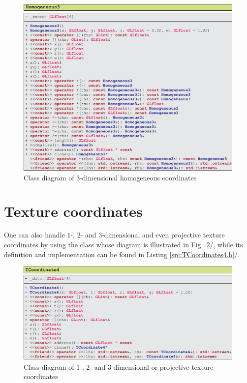 \documentclass[b5paper, twosided]{book}
\newcommand{\CBlue}[1]{{\color[rgb]{0.0, 0.0, 0.9}{#1}}}
\DeclareRobustCommand{\mref}[1]{\ref{#1}{\relsize{-1}/\pageref{#1}}}
\begin{document}
\begin{figure}[!h]
    \centering
    \includegraphics[]{images/UMLHomogeneous3.pdf}
    \caption{Class diagram of $3$-dimensional homogeneous coordinates}
    \label{fig:UMLHomogeneous3}
\end{figure}




\section{Texture coordinates}

One can also handle $1$-, $2$- and $3$-dimensional and even projective texture coordinates by using the class \CBlue{TCoordinate4} whose diagram is illustrated in Fig.\ \mref{fig:UMLTCoordinate4}, while its definition and implementation can be found in Listing \mref{src:TCoordinates4.h}.

\begin{figure}[!h]
    \centering
    \includegraphics[]{images/UMLTCoordinate4.pdf}
    \caption{Class diagram of $1$-, $2$- and $3$-dimensional or projective texture coordinates}
    \label{fig:UMLTCoordinate4}
\end{figure}
\end{document}
